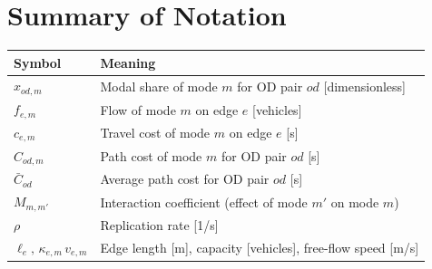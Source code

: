 \documentclass[11pt,a4paper]{article}
\begin{document}
\section{Summary of Notation}

\begin{center}
\renewcommand{\arraystretch}{1.3}
\begin{tabular}{@{}lp{9.5cm}@{}}
\toprule
Symbol & Meaning \\
\midrule
$x_{od,m}$ & Modal share of mode $m$ for OD pair $od$ [dimensionless] \\
$f_{e,m}$ & Flow of mode $m$ on edge $e$ [vehicles] \\
$c_{e,m}$ & Travel cost of mode $m$ on edge $e$ [s] \\
$C_{od,m}$ & Path cost of mode $m$ for OD pair $od$ [s] \\
$\bar C_{od}$ & Average path cost for OD pair $od$ [s] \\
$M_{m,m'}$ & Interaction coefficient (effect of mode $m'$ on mode $m$)\\
$\rho$ & Replication rate [1/s] \\
$\ell_e,\,\kappa_{e,m}\,v_{e,m}$ & Edge length [m], capacity [vehicles], free-flow speed [m/s] \\
\bottomrule
\end{tabular}
\end{center}
\end{document}
